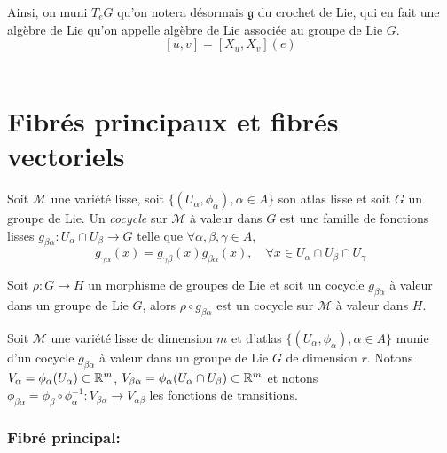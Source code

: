 \documentclass[12pt, a4paper]{book}
\begin{document}
Ainsi, on muni $T_eG$ qu'on notera désormais $\mathfrak{g}$ du crochet de Lie, qui en fait une algèbre de Lie qu'on appelle algèbre de Lie associée au groupe de Lie $G$.
$$[u, v] = [X_u, X_v](e)$$ \\

\newpage
\section{Fibrés principaux et fibrés vectoriels}

\begin{defi}[Cocycle]
Soit $\mathcal{M}$ une variété lisse, soit $\{(U_\alpha, \phi_\alpha), \alpha \in A\}$ son atlas lisse et soit $G$ un groupe de Lie. Un \emph{cocycle} sur $\mathcal{M}$ à valeur dans $G$ est une famille de fonctions lisses $g_{\beta\alpha} : U_\alpha \cap U_\beta \to G$ telle que $\forall \alpha, \beta, \gamma \in A$,
$$g_{\gamma\alpha}(x) = g_{\gamma\beta}(x)g_{\beta\alpha}(x), \quad \forall x \in U_\alpha \cap U_\beta \cap U_\gamma$$ 
\end{defi}

\begin{pro}
Soit $\rho : G \to H$ un morphisme de groupes de Lie et soit un cocycle $g_{\beta\alpha}$ à valeur dans un groupe de Lie $G$, alors $\rho \circ g_{\beta\alpha}$ est un cocycle sur $\mathcal{M}$ à valeur dans $H$. \\
\end{pro}

Soit $\mathcal{M}$ une variété lisse de dimension $m$ et d'atlas $\{(U_\alpha, \phi_\alpha), \alpha \in A\}$ munie d'un cocycle $g_{\beta\alpha}$ à valeur dans un groupe de Lie $G$ de dimension $r$. Notons $V_\alpha = \phi_\alpha(U_\alpha) \subset \mathbb{R}^m$, $V_{\beta\alpha} = \phi_\alpha(U_\alpha \cap U_\beta) \subset \mathbb{R}^m$ et notons $\phi_{\beta\alpha} = \phi_\beta \circ \phi_\alpha^{-1} : V_{\beta\alpha} \to V_{\alpha\beta}$ les fonctions de transitions.

\subsubsection{Fibré principal:}
\end{document}
